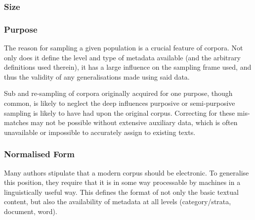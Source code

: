 


\subsubsection{Size}


\subsubsection{Purpose}
The reason for sampling a given population is a crucial feature of corpora.  Not only does it define the level and type of metadata available (and the arbitrary definitions used therein), it has a large influence on the sampling frame used, and thus the validity of any generalisations made using said data.


Sub and re-sampling of corpora originally acquired for one purpose, though common, is likely to neglect the deep influences purposive or semi-purposive sampling is likely to have had upon the original corpus.  Correcting for these mis-matches may not be possible without extensive auxiliary data, which is often unavailable or impossible to accurately assign to existing texts.



\subsubsection{Normalised Form}
Many authors stipulate that a modern corpus should be electronic.  To generalise this position, they require that it is in some way processable by machines in a linguistically useful way.  This defines the format of not only the basic textual content, but also the availability of metadata at all levels (category/strata, document, word).


